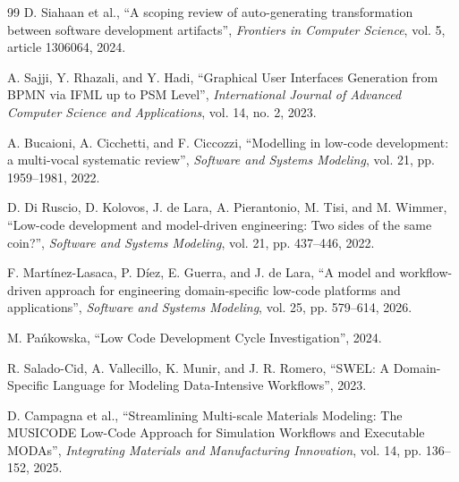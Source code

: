 \documentclass[12pt,a4paper]{article}
\begin{document}
\begin{thebibliography}{99}
D. Siahaan et al., ``A scoping review of auto-generating transformation between software development artifacts'', \textit{Frontiers in Computer Science}, vol. 5, article 1306064, 2024.

A. Sajji, Y. Rhazali, and Y. Hadi, ``Graphical User Interfaces Generation from BPMN via IFML up to PSM Level'', \textit{International Journal of Advanced Computer Science and Applications}, vol. 14, no. 2, 2023.

A. Bucaioni, A. Cicchetti, and F. Ciccozzi, ``Modelling in low-code development: a multi-vocal systematic review'', \textit{Software and Systems Modeling}, vol. 21, pp. 1959--1981, 2022.

D. Di Ruscio, D. Kolovos, J. de Lara, A. Pierantonio, M. Tisi, and M. Wimmer, ``Low-code development and model-driven engineering: Two sides of the same coin?'', \textit{Software and Systems Modeling}, vol. 21, pp. 437--446, 2022.

F. Martínez-Lasaca, P. Díez, E. Guerra, and J. de Lara, ``A model and workflow-driven approach for engineering domain-specific low-code platforms and applications'', \textit{Software and Systems Modeling}, vol. 25, pp. 579--614, 2026.

M. Pańkowska, ``Low Code Development Cycle Investigation'', 2024.

R. Salado-Cid, A. Vallecillo, K. Munir, and J. R. Romero, ``SWEL: A Domain-Specific Language for Modeling Data-Intensive Workflows'', 2023.

D. Campagna et al., ``Streamlining Multi-scale Materials Modeling: The MUSICODE Low-Code Approach for Simulation Workflows and Executable MODAs'', \textit{Integrating Materials and Manufacturing Innovation}, vol. 14, pp. 136--152, 2025.

\end{thebibliography}
\end{document}

